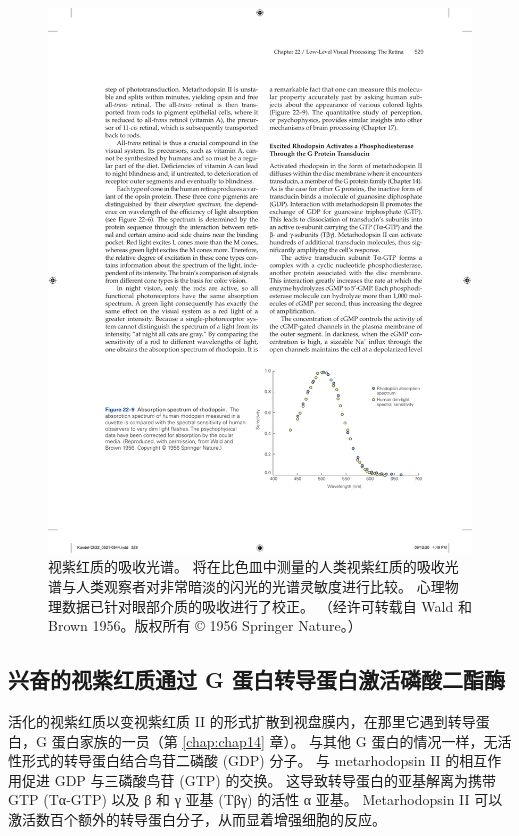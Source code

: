 \begin{figure}[htbp]
	\centering
	\includegraphics[width=1.0\linewidth]{chap22/fig_22_9}
	\caption{视紫红质的吸收光谱。 
		将在比色皿中测量的人类视紫红质的吸收光谱与人类观察者对非常暗淡的闪光的光谱灵敏度进行比较。 
		心理物理数据已针对眼部介质的吸收进行了校正。 （经许可转载自 Wald 和 Brown 1956。版权所有 © 1956 Springer Nature。）}
	\label{fig:22_9}
\end{figure}


\subsection{兴奋的视紫红质通过 G 蛋白转导蛋白激活磷酸二酯酶}
活化的视紫红质以变视紫红质 II 的形式扩散到视盘膜内，在那里它遇到转导蛋白，G 蛋白家族的一员（第 \ref{chap:chap14} 章）。 
与其他 G 蛋白的情况一样，无活性形式的转导蛋白结合鸟苷二磷酸 (GDP) 分子。 
与 metarhodopsin II 的相互作用促进 GDP 与三磷酸鸟苷 (GTP) 的交换。 
这导致转导蛋白的亚基解离为携带 GTP (Tα-GTP) 以及 β 和 γ 亚基 (Tβγ) 的活性 α 亚基。 
Metarhodopsin II 可以激活数百个额外的转导蛋白分子，从而显着增强细胞的反应。



